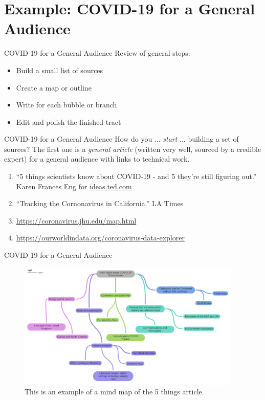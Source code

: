 \documentclass{beamer}
\begin{document}
\section{Example: COVID-19 for a General Audience}

\begin{frame}{COVID-19 for a General Audience}
Review of general steps:
\begin{itemize}
\item Build a small list of sources
\item Create a map or outline
\item Write for each bubble or branch
\item Edit and polish the finished tract
\end{itemize}
\end{frame}

\begin{frame}{COVID-19 for a General Audience}
\alert{How do you ... \textit{start} ... building a set of sources?}  The first one is a \textit{general article} (written very well, sourced by a credible expert) for a general audience with links to technical work.
\begin{enumerate}
\item ``5 things scientists know about COVID-19 - and 5 they're still figuring out.'' Karen Frances Eng for \url{ideas.ted.com}
\item ``Tracking the Cornonavirus in California.'' LA Times
\item \url{https://coronavirus.jhu.edu/map.html}
\item \url{https://ourworldindata.org/coronavirus-data-explorer}
\end{enumerate}
\end{frame}

\begin{frame}{COVID-19 for a General Audience}
\begin{figure}
\includegraphics[width=0.95\textwidth]{figures/COVID_map.pdf}
\caption{\label{fig:covid1} This is an example of a mind map of the 5 things article.}
\end{figure}
\end{frame}
\end{document}
